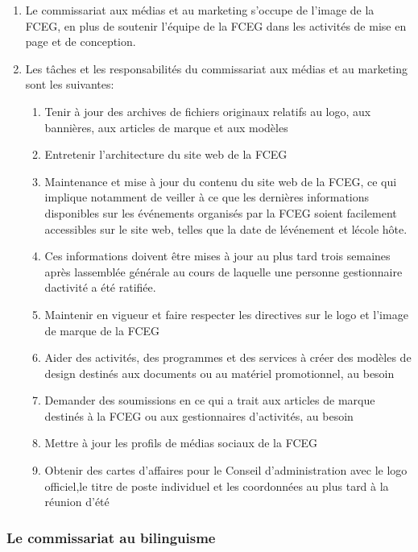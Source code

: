 \begin{enumerate}
 \item
  Le commissariat aux médias et au marketing s’occupe de l’image de la FCEG, en plus de soutenir l’équipe de la FCEG dans les activités de mise en page et de conception.
 \item
  Les tâches et les responsabilités du commissariat aux médias et au marketing sont les suivantes:

  \begin{enumerate}
   \item
    Tenir à jour des archives de fichiers originaux relatifs au logo, aux bannières, aux articles de marque et aux modèles
   \item
    Entretenir l’architecture du site web de la FCEG
   \item
    Maintenance et mise à jour du contenu du site web de la FCEG, ce qui implique notamment de veiller à ce que les dernières informations disponibles sur les événements organisés par la FCEG soient facilement accessibles sur le site web, telles que la date de l\textquotesingle événement et l\textquotesingle école hôte.
   \item
    Ces informations doivent être mises à jour au plus tard trois semaines après l\textquotesingle assemblée générale au cours de laquelle une personne gestionnaire d\textquotesingle activité a été ratifiée.
   \item
    Maintenir en vigueur et faire respecter les directives sur le logo et l’image de marque de la FCEG
   \item
    Aider des activités, des programmes et des services à créer des modèles de design destinés aux documents ou au matériel promotionnel, au besoin
   \item
    Demander des soumissions en ce qui a trait aux articles de marque destinés à la FCEG ou aux gestionnaires d’activités, au besoin
   \item
    Mettre à jour les profils de médias sociaux de la FCEG
   \item
    Obtenir des cartes d’affaires pour le Conseil d’administration avec le logo officiel,le titre de poste individuel et les coordonnées au plus tard à la réunion d’été
  \end{enumerate}
\end{enumerate}

\subsubsection{Le commissariat au bilinguisme}
\label{lela-commissaire-au-bilinguisme}

